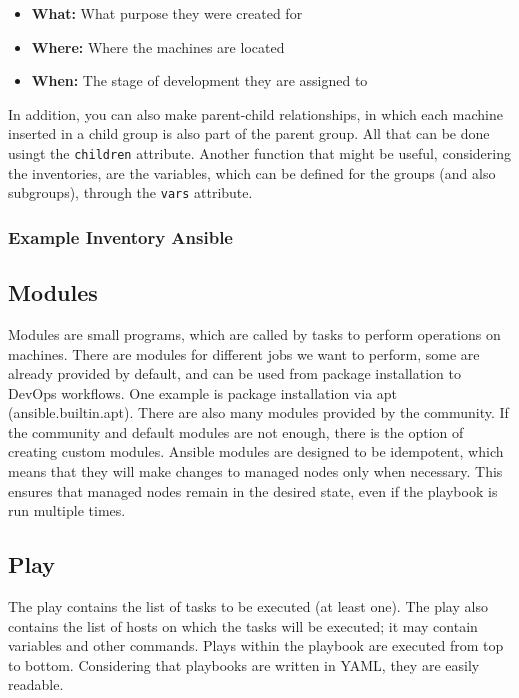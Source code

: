 \documentclass[12pt,a4paper,openright,twoside]{book}
\begin{document}
            \begin{itemize}
                \item \textbf{What:} What purpose they were created for
                \item \textbf{Where:} Where the machines are located
                \item \textbf{When:} The stage of development they are assigned to
            \end{itemize}
            
            In addition, you can also make parent-child relationships, in which each machine inserted in a child group is also part of the parent group. All that can be done usingt the \texttt{children} attribute.
            Another function that might be useful, considering the inventories, are the variables, which can be defined for the groups (and also subgroups), through the \texttt{vars} attribute.

\subsubsection{Example Inventory Ansible}



\subsection{Modules}
Modules are small programs, which are called by tasks to perform operations on machines.
There are modules for different jobs we want to perform, some are already provided by default, and can be used from package installation to DevOps workflows.
One example is package installation via apt (ansible.builtin.apt).
There are also many modules provided by the community. If the community and default modules are not enough, there is the option of creating custom modules\cite{ansibleDocNewModules}.
Ansible modules are designed to be idempotent, which means that they will make changes to managed nodes only when necessary. This ensures that managed nodes remain in the desired state, even if the playbook is run multiple times.

\subsection{Play}
The play contains the list of tasks to be executed (at least one). The play also contains the list of hosts on which the tasks will be executed; it may contain variables and other commands.
Plays within the playbook are executed from top to bottom. Considering that playbooks are written in YAML, they are easily readable.
\end{document}
